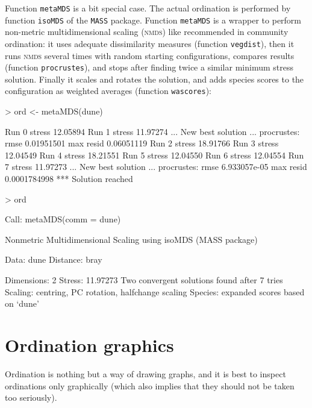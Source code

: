 \documentclass[a4paper,10pt]{amsart}
\begin{document}
Function \texttt{metaMDS} is a bit special case.  The actual
ordination is performed by function \texttt{isoMDS} of the \texttt{MASS}
package.  Function \texttt{metaMDS} is a wrapper to perform non-metric
multidimensional scaling (\textsc{nmds}) like recommended in community
ordination: it uses adequate dissimilarity measures (function
\texttt{vegdist}), then it runs \textsc{nmds} several times with
random starting configurations, compares results (function
\texttt{procrustes}), and stops after finding twice a similar minimum stress
solution.  Finally it scales and rotates the solution, and adds
species scores to the configuration as weighted averages (function
\texttt{wascores}):
\begin{Schunk}
\begin{Sinput}
> ord <- metaMDS(dune)
\end{Sinput}
\begin{Soutput}
Run 0 stress 12.05894 
Run 1 stress 11.97274 
... New best solution
... procrustes: rmse 0.01951501  max resid 0.06051119 
Run 2 stress 18.91766 
Run 3 stress 12.04549 
Run 4 stress 18.21551 
Run 5 stress 12.04550 
Run 6 stress 12.04554 
Run 7 stress 11.97273 
... New best solution
... procrustes: rmse 6.933057e-05  max resid 0.0001784998 
*** Solution reached
\end{Soutput}
\begin{Sinput}
> ord
\end{Sinput}
\begin{Soutput}
Call:
metaMDS(comm = dune) 

Nonmetric Multidimensional Scaling using isoMDS (MASS package)

Data:     dune 
Distance: bray 

Dimensions: 2 
Stress:     11.97273 
Two convergent solutions found after 7 tries
Scaling: centring, PC rotation, halfchange scaling 
Species: expanded scores based on ‘dune’ 
\end{Soutput}
\end{Schunk}

\section{Ordination graphics}

Ordination is nothing but a way of drawing graphs, and it is best to
inspect ordinations only graphically (which also implies that they
should not be taken too seriously).
\end{document}
